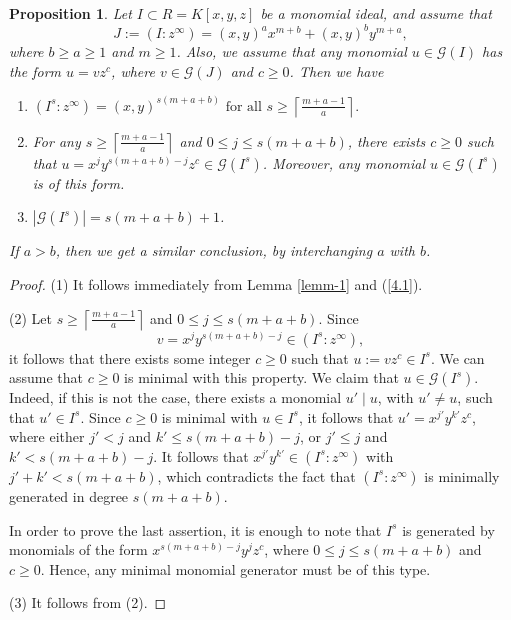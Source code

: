 \documentclass[11pt]{amsart}
\newtheorem{proposition}[theorem]{Proposition}
\begin{document}
\begin{proposition}\label{cor-magic}
Let $I\subset R=K[x,y,z]$ be a monomial ideal, and assume that 
$$J:=(I:z^{\infty})=(x,y)^a x^{m+b} + (x,y)^b y^{m+a},$$
where $b\geq a\geq 1$ and $m\geq 1$. Also, we assume that any monomial $u\in \mathcal G(I)$ has the form
$u=vz^c$, where $v\in \mathcal G(J)$ and $c\geq 0$. Then we have
\begin{enumerate}
\item[(1)] $(I^s:z^{\infty})=(x,y)^{s(m+a+b)} \text{ for all }s\geq \left\lceil \frac{m+a-1}{a} \right\rceil.$
\item[(2)] For any $s\geq \left\lceil \frac{m+a-1}{a} \right\rceil$ and $0\leq j\leq s(m+a+b)$, there exists
           $c\geq 0$ such that $u=x^j y^{s(m+a+b)-j} z^c\in \mathcal G(I^s)$. Moreover, any monomial $u\in \mathcal G(I^s)$
					 is of this form.
\item[(3)] $|\mathcal G(I^s)| = s(m+a+b)+1$.
\end{enumerate}
If $a>b$,  then we get a similar conclusion, by interchanging $a$ with $b$.
\end{proposition}

\begin{proof}
(1) It follows immediately from Lemma \ref{lemm-1} and  (\ref{4.1}).

(2) Let $s\geq \left\lceil \frac{m+a-1}{a} \right\rceil$ and $0\leq j\leq s(m+a+b)$. 
Since $$v=x^j y^{s(m+a+b)-j} \in (I^s:z^{\infty}),$$ it follows that there exists some integer $c\geq 0$
such that $u:=vz^c \in I^s$. We can assume that $c\geq 0$ is minimal with this property. 
We claim that $u\in \mathcal G(I^s)$. Indeed, if this is not the case, there exists a monomial $u' \mid u$, with $u'\neq u$, 
such that $u'\in I^s$. Since $c\geq 0$ is minimal with $u\in I^s$, it follows that $u'=x^{j'}y^{k'}z^c$, where 
either $j'<j$ and $k'\leq s(m+a+b)-j$, or $j'\leq j$ and $k'<s(m+a+b)-j$. 
It follows that $x^{j'}y^{k'}\in (I^s:z^{\infty})$  with $j'+k'<s(m+a+b)$, which contradicts 
the fact that $(I^s:z^{\infty})$ is minimally generated in degree $s(m+a+b)$.

In order to prove the last assertion, it is enough to note that $I^s$ is generated by monomials of the form
$x^{s(m+a+b)-j}y^jz^c$, where $0\leq j\leq s(m+a+b)$ and $c\geq 0$. Hence, any minimal monomial generator must be of this type.

(3) It follows from (2).
\end{proof}


\end{document}
